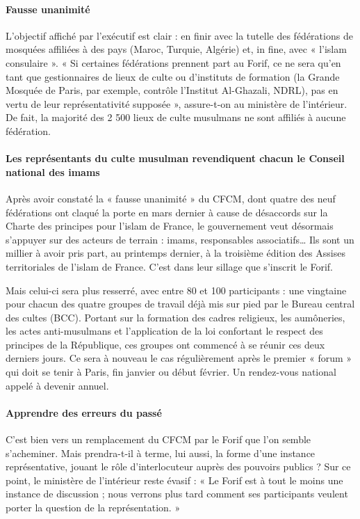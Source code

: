 \paragraph{Fausse unanimité}
L’objectif affiché par l’exécutif est clair : en finir avec la tutelle des fédérations de mosquées affiliées à des pays (Maroc, Turquie, Algérie) et, in fine, avec « l’islam consulaire ». « Si certaines fédérations prennent part au Forif, ce ne sera qu’en tant que gestionnaires de lieux de culte ou d’instituts de formation (la Grande Mosquée de Paris, par exemple, contrôle l’Institut Al-Ghazali, NDRL), pas en vertu de leur représentativité supposée », assure-t-on au ministère de l’intérieur. De fait, la majorité des 2 500 lieux de culte musulmans ne sont affiliés à aucune fédération.

\paragraph{Les représentants du culte musulman revendiquent chacun le Conseil national des imams}

Après avoir constaté la « fausse unanimité » du CFCM, dont quatre des neuf fédérations ont claqué la porte en mars dernier à cause de désaccords sur la Charte des principes pour l’islam de France, le gouvernement veut désormais s’appuyer sur des acteurs de terrain : imams, responsables associatifs… Ils sont un millier à avoir pris part, au printemps dernier, à la troisième édition des Assises territoriales de l’islam de France. C’est dans leur sillage que s’inscrit le Forif.

Mais celui-ci sera plus resserré, avec entre 80 et 100 participants : une vingtaine pour chacun des quatre groupes de travail déjà mis sur pied par le Bureau central des cultes (BCC). Portant sur la formation des cadres religieux, les aumôneries, les actes anti-musulmans et l’application de la loi confortant le respect des principes de la République, ces groupes ont commencé à se réunir ces deux derniers jours. Ce sera à nouveau le cas régulièrement après le premier « forum » qui doit se tenir à Paris, fin janvier ou début février. Un rendez-vous national appelé à devenir annuel.

\paragraph{Apprendre des erreurs du passé}
C’est bien vers un remplacement du CFCM par le Forif que l’on semble s’acheminer. Mais prendra-t-il à terme, lui aussi, la forme d’une instance représentative, jouant le rôle d’interlocuteur auprès des pouvoirs publics ? Sur ce point, le ministère de l’intérieur reste évasif : « Le Forif est à tout le moins une instance de discussion ; nous verrons plus tard comment ses participants veulent porter la question de la représentation. »

